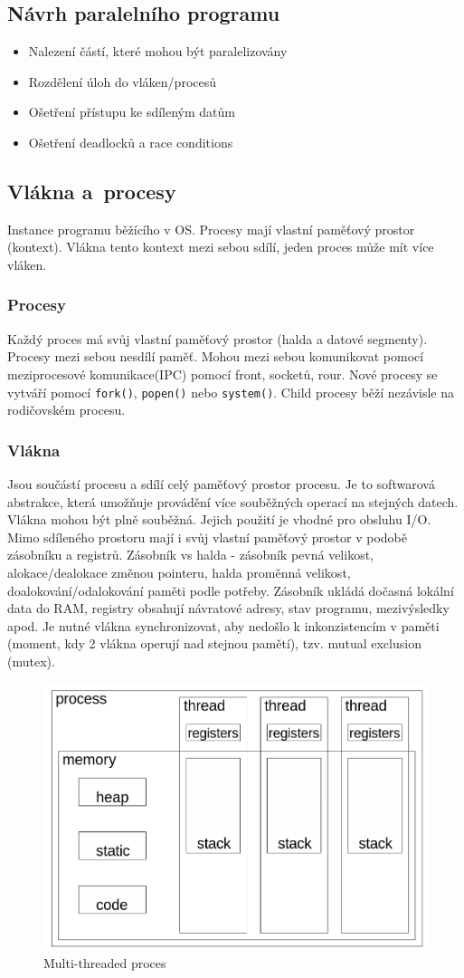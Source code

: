 \subsection{Návrh paralelního programu}
\begin{itemize}
    \item Nalezení částí, které mohou být paralelizovány
    \item Rozdělení úloh do vláken/procesů
    \item Ošetření přístupu ke sdíleným datům
    \item Ošetření deadlocků a race conditions
\end{itemize}

\subsection{Vlákna a~procesy}
Instance programu běžícího v OS. Procesy mají vlastní paměťový prostor (kontext). Vlákna tento kontext mezi sebou sdílí, jeden proces může mít více vláken.

\subsubsection{Procesy}
Každý proces má svůj vlastní paměťový prostor (halda a datové segmenty). Procesy mezi sebou nesdílí paměť. Mohou mezi sebou komunikovat pomocí meziprocesové komunikace(IPC) pomocí front, socketů, rour.  Nové procesy se vytváří pomocí \texttt{fork()}, \texttt{popen()} nebo \texttt{system()}. Child procesy běží nezávisle na rodičovském procesu.

\subsubsection{Vlákna}
Jsou součástí procesu a sdílí celý paměťový prostor procesu. Je to softwarová abstrakce, která umožňuje provádění více souběžných operací na stejných datech. Vlákna mohou být plně souběžná. 
Jejich použití je vhodné pro obsluhu I/O. Mimo sdíleného prostoru mají i svůj vlastní paměťový prostor v podobě zásobníku a registrů. Zásobník vs halda - zásobník pevná velikost, alokace/dealokace změnou pointeru, halda proměnná velikost, doalokování/odalokování paměti podle potřeby. Zásobník ukládá dočasná lokální data do RAM, registry obsahují návratové adresy, stav programu, mezivýsledky apod. Je nutné vlákna synchronizovat, aby nedošlo k inkonzistencím v paměti (moment, kdy 2 vlákna operují nad stejnou pamětí), tzv. mutual exclusion (mutex).
\begin{figure}[ht]
    \centering
    \includegraphics[width=0.5\linewidth]{pict/multithread.png}
    \caption{Multi-threaded proces}
\end{figure}

